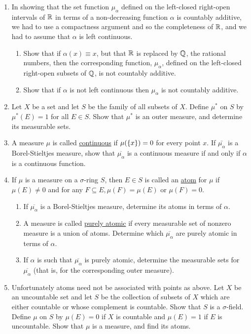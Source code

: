 \begin{enumerate}[label=\arabic*),ref=\arabic*]
\item In showing that the set function $\mu_\alpha$ defined on the left-closed right-open intervals of $\mathbb{R}$ in terms of a non-decreasing function $\alpha$ is countably additive, we had to use a compactness argument and so the completeness of $\mathbb{R}$, and we had to assume that $\alpha$ is left continuous.

\begin{enumerate}
\item Show that if $\alpha(x) \equiv x$, but that $\mathbb{R}$ is replaced by $\mathbb{Q}$, the rational numbers, then the corresponding function, $\mu_\alpha$, defined on the left-closed right-open subsets of $\mathbb{Q}$, is not countably additive.
\item Show that if $\alpha$ is not left continuous then $\mu_\alpha$ is not countably additive.
\end{enumerate}

\item
\label{exer:empty meas sets}
Let $X$ be a set and let $S$ be the family of all subsets of $X$. Define $\mu^*$ on $S$ by $\mu^*(E)=1$ for all $E\in S$. Show that $\mu^*$ is an outer measure, and determine its measurable sets.

\item A measure $\mu$ is called \underline{continuous} if $\mu(\left\{x\right\})=0$ for every point $x$. If $\bar{\mu_\alpha}$ is a Borel-Stieltjes measure, show that $\overline{\mu_\alpha}$ is a continuous measure if and only if $\alpha$ is a continuous function.

\item If $\mu$ is a measure on a $\sigma$-ring $S$, then $E \in S$ is called an \underline{atom} for $\mu$ if $\mu(E) \neq 0$ and for any $F \subseteq E, \mu(F)=\mu(E)$ or $\mu(F)=0$.
\begin{enumerate}
\item If $\overline{\mu_\alpha}$ is a Borel-Stieltjes measure, determine its atoms in terms of $\alpha$.
\item A measure is called \underline{purely atomic} if every measurable set of nonzero measure is a union of atoms. Determine which $\overline{\mu_\alpha}$ are purely atomic in terms of $\alpha$.
\item If $\alpha$ is such that $\overline{\mu_\alpha}$ is purely atomic, determine the measurable sets for $\overline{\mu_\alpha}$ (that is, for the corresponding outer measure).
\end{enumerate}


\item Unfortunately atoms need not be associated with points as above. Let ${X}$ be an uncountable set and let ${S}$ be the collection of subsets of ${X}$ which are either countable or whose complement is countable. Show that ${S}$ is a $\sigma$-field. Define $\mu$ on ${S}$ by $\mu(E)=0$ if ${X}$ is countable and $\mu(E)=1$ if $E$ is uncountable. Show that $\mu$ is a measure, and find its atoms.


\end{enumerate}
